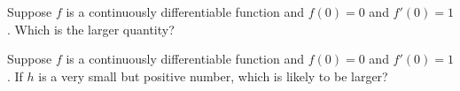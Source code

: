 \documentclass{ximera}
\newcommand{\recommendation}[1]{}
\newcommand{\GoodQuestions}[1]{}
\begin{document}
\begin{shuffle}


\begin{problem}
  Suppose $f$ is a continuously differentiable function and $f(0) = 0$ and $f'(0) = 1$.  Which is the larger quantity?
  \begin{multipleChoice}
  \end{multipleChoice}
\end{problem}

\begin{problem}
  Suppose $f$ is a continuously differentiable function and $f(0) = 0$ and $f'(0) = 1$. If $h$ is a very small but positive number, which is likely to be larger?
  \begin{multipleChoice}
  \end{multipleChoice}
\end{problem}


\begin{problem}

  \recommendation{Vic}
  \GoodQuestions{Subject: Linear approximation 5D}
  

\end{problem}
\end{shuffle}
\end{document}
